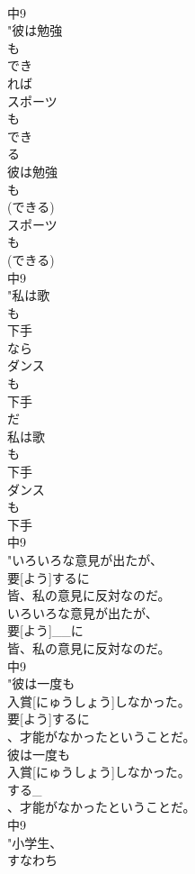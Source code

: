 \documentclass[8pt]{extreport}
\begin{document}
\begin{CJK}{UTF8}{min}
\\	中9
\\	"彼は勉強
\\	も
\\	でき
\\	れば
\\	スポーツ
\\	も
\\	でき
\\	る
\\	彼は勉強
\\	も
\\	(できる)
\\	スポーツ
\\	も
\\	(できる)
\\	中9
\\	"私は歌
\\	も
\\	下手
\\	なら
\\	ダンス
\\	も
\\	下手
\\	だ
\\	私は歌
\\	も
\\	下手
\\	ダンス
\\	も
\\	下手
\\	中9
\\	"いろいろな意見が出たが、
\\	要[よう]するに
\\	皆、私の意見に反対なのだ。
\\	いろいろな意見が出たが、
\\	要[よう]__に
\\	皆、私の意見に反対なのだ。
\\	中9
\\	"彼は一度も
\\	入賞[にゅうしょう]しなかった。
\\	要[よう]するに
\\	、才能がなかったということだ。
\\	彼は一度も
\\	入賞[にゅうしょう]しなかった。
\\	する_
\\	、才能がなかったということだ。
\\	中9
\\	"小学生、
\\	すなわち

\end{CJK}
\end{document}
